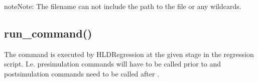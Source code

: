 \documentclass[letterpaper,10pt,english]{sphinxmanual}
\begin{document}
\begin{sphinxadmonition}{note}{Note:}
\sphinxAtStartPar
The filename can not include the path to the file or any wildcards.
\end{sphinxadmonition}


\subsection{run\_command()}
\label{\detokenize{api:run-command}}
\sphinxAtStartPar
The command is executed by HLDRegression at the given stage in the regression script. I.e. pre\sphinxhyphen{}simulation commands will have
to be called prior to {\hyperref[\detokenize{api:start}]{}} and post\sphinxhyphen{}simulation commands need to be called after {\hyperref[\detokenize{api:start}]{}}.

\begin{sphinxVerbatim}[commandchars=\\\{\}]
\end{sphinxVerbatim}
\end{document}
